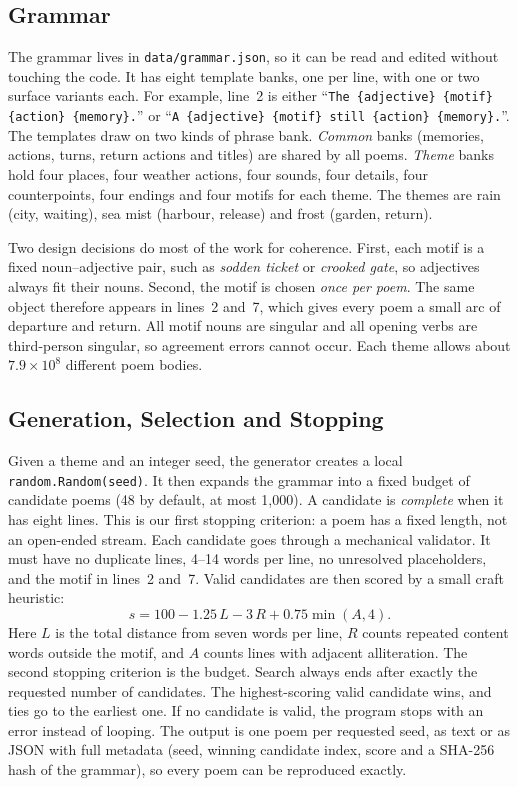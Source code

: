 \documentclass[letterpaper]{article}
\newcommand{\code}[1]{\texttt{\small #1}}
\begin{document}
\subsection{Grammar}
The grammar lives in \code{data/grammar.json}, so it can be read and
edited without touching the code. It has eight template banks, one per
line, with one or two surface variants each. For example, line~2 is
either ``\code{The \{adjective\} \{motif\} \{action\} \{memory\}.}'' or
``\code{A \{adjective\} \{motif\} still \{action\} \{memory\}.}''.
The templates draw on two kinds of phrase bank. \emph{Common} banks
(memories, actions, turns, return actions and titles) are shared by all
poems. \emph{Theme} banks hold four places, four weather actions, four
sounds, four details, four counterpoints, four endings and four motifs
for each theme. The themes are rain (city, waiting), sea mist (harbour,
release) and frost (garden, return).

Two design decisions do most of the work for coherence. First, each
motif is a fixed noun--adjective pair, such as \emph{sodden ticket} or
\emph{crooked gate}, so adjectives always fit their nouns. Second, the
motif is chosen \emph{once per poem}. The same object therefore appears
in lines~2 and~7, which gives every poem a small arc of departure and
return. All motif nouns are singular and all opening verbs are
third-person singular, so agreement errors cannot occur. Each theme
allows about $7.9\times10^{8}$ different poem bodies.

\subsection{Generation, Selection and Stopping}
Given a theme and an integer seed, the generator creates a local
\code{random.Random(seed)}. It then expands the grammar into a fixed
budget of candidate poems (48 by default, at most 1,000). A candidate is
\emph{complete} when it has eight lines. This is our first stopping
criterion: a poem has a fixed length, not an open-ended stream. Each
candidate goes through a mechanical validator. It must have no
duplicate lines, 4--14 words per line, no unresolved placeholders, and
the motif in lines~2 and~7. Valid candidates are then scored by a small
craft heuristic:
\[
s = 100 - 1.25\,L - 3\,R + 0.75\min(A,4).
\]
Here $L$ is the total distance from seven words per line, $R$ counts
repeated content words outside the motif, and $A$ counts lines with
adjacent alliteration. The second stopping criterion is the budget.
Search always ends after exactly the requested number of candidates.
The highest-scoring valid candidate wins, and ties go to the earliest
one. If no candidate is valid, the program stops with an error instead
of looping. The output is one poem per requested seed, as text or as
JSON with full metadata (seed, winning candidate index, score and a
SHA-256 hash of the grammar), so every poem can be reproduced exactly.
\end{document}
